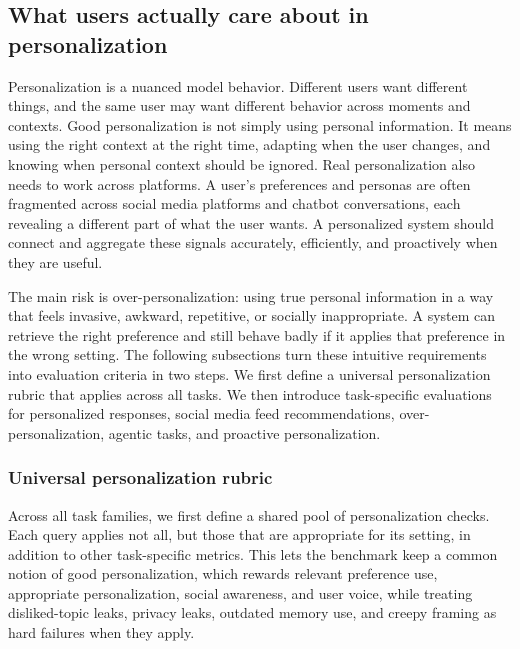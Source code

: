 \documentclass[]{fairmeta}
\begin{document}
\subsection{What users actually care about in personalization}
Personalization is a nuanced model behavior. Different users want different things, and the same user may want different behavior across moments and contexts. Good personalization is not simply using personal information. It means using the right context at the right time, adapting when the user changes, and knowing when personal context should be ignored. Real personalization also needs to work across platforms. A user’s preferences and personas are often fragmented across social media platforms and chatbot conversations, each revealing a different part of what the user wants. A personalized system should connect and aggregate these signals accurately, efficiently, and proactively when they are useful.

The main risk is over-personalization: using true personal information in a way that feels invasive, awkward, repetitive, or socially inappropriate. A system can retrieve the right preference and still behave badly if it applies that preference in the wrong setting. The following subsections turn these intuitive requirements into evaluation criteria in two steps. We first define a universal personalization rubric that applies across all tasks. We then introduce task-specific evaluations for personalized responses, social media feed recommendations, over-personalization, agentic tasks, and proactive personalization.

\subsubsection{Universal personalization rubric}
\label{subsec:rubric}
  
Across all task families, we first define a shared pool of personalization checks. Each query applies not all, but those that are appropriate for its setting, in addition to other task-specific metrics. This lets the benchmark keep a common notion of good personalization, which rewards relevant preference use, appropriate personalization, social awareness, and user voice, while treating disliked-topic leaks, privacy leaks, outdated memory use, and creepy framing as hard failures when they apply.
\end{document}
